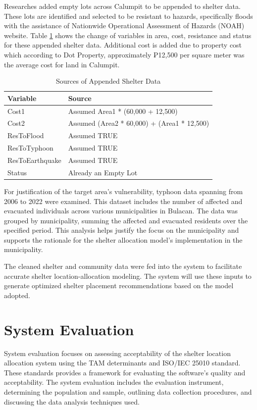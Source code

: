 	Researches added empty lots across Calumpit to be appended to shelter data. These lots are identified and selected to be resistant to hazards, specifically floods with the assistance of Nationwide Operational Assessment of Hazards (NOAH) website. Table \ref{AppendData} shows the change of variables in area, cost, resistance and status for these appended shelter data. Additional cost is added due to property cost which according to Dot Property, approximately ₱12,500 per square meter was the average cost for land in Calumpit.
	
	\begin{table}[h]
		\centering
		\caption{Sources of Appended Shelter Data}
		\label{AppendData}
		\renewcommand{\arraystretch}{1.3}
			\begin{tabular}{ll}
				\hline
				\multicolumn{1}{l}{\textbf{Variable}} & 
				\multicolumn{1}{l}{\textbf{Source}} \\ \hline
				Cost1     & Assumed Area1 * (60,000 + 12,500) \\ 
				Cost2     & Assumed (Area2 * 60,000) + (Area1 * 12,500) \\ 
				ResToFlood     & Assumed TRUE \\ 
				ResToTyphoon    & Assumed TRUE \\ 
				ResToEarthquake     & Assumed TRUE \\ 
				Status     & Already an Empty Lot \\ \hline
				
			\end{tabular}
	\end{table}
	
	For justification of the target area’s vulnerability, typhoon data spanning from 2006 to 2022 were examined. This dataset includes the number of affected and evacuated individuals across various municipalities in Bulacan. The data was grouped by municipality, summing the affected and evacuated residents over the specified period. This analysis helps justify the focus on the municipality and supports the rationale for the shelter allocation model’s implementation in the municipality.
	
	The cleaned shelter and community data were fed into the system to facilitate accurate shelter location-allocation modeling. The system will use these inputs to generate optimized shelter placement recommendations based on the model adopted.
	
	
\section{System Evaluation}
	System evaluation focuses on assessing acceptability of the shelter location allocation system using the TAM determinants and ISO/IEC 25010 standard. These standards provides a framework for evaluating the software's quality and acceptability. The system evaluation includes the evaluation instrument, determining the population and sample, outlining data collection procedures, and discussing the data analysis techniques used.

